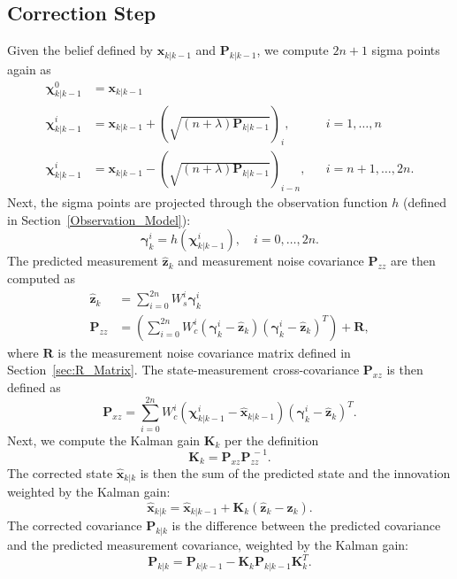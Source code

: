 \subsection{Correction Step}

Given the belief defined by $\mathbf{x}_{k | k-1}$ and $\mathbf{P}_{k | k-1}$, we compute $2n + 1$ sigma points again as
%
\begin{align}
\mathbf{\chi}^{0}_{k | k-1} &= \mathbf{x}_{k | k-1} & \nonumber\\
\mathbf{\chi}^{i}_{k | k-1} &= \mathbf{x}_{k | k-1} + \left( \sqrt{\left( n + \lambda \right) \mathbf{P}_{k | k-1}} \right)_{i}, &&i = 1, \dots, n \\
\mathbf{\chi}^{i}_{k | k-1} &= \mathbf{x}_{k | k-1} - \left( \sqrt{\left( n + \lambda \right) \mathbf{P}_{k | k-1}} \right)_{i-n}, &&i = n+1, \dots, 2n. \nonumber
\end{align}
%
Next, the sigma points are projected through the observation function $h$ (defined in Section~\ref{Observation_Model}):
%
\begin{equation}
\mathbf{\gamma}^{i}_{k} = h \left( \mathbf{\chi}^{i}_{k | k-1} \right), \quad i = 0, \dots, 2n.
\end{equation}
%
The predicted measurement $\hat{\mathbf{z}}_{k}$ and measurement noise covariance $\mathbf{P}_{zz}$ are then computed as
%
\begin{align}
\hat{\mathbf{z}}_{k} &= \sum^{2n}_{i=0} W^{i}_{s} \mathbf{\gamma}^{i}_{k} \\
\mathbf{P}_{zz} &= \left( \sum^{2n}_{i=0} W^{i}_{c} \left( \mathbf{\gamma}^{i}_{k} - \hat{\mathbf{z}}_{k} \right) \left( \mathbf{\gamma}^{i}_{k} - \hat{\mathbf{z}}_{k} \right)^{T} \right) + \mathbf{R},
\end{align}
%
where $\mathbf{R}$ is the measurement noise covariance matrix defined in Section~\ref{sec:R_Matrix}. The state-measurement cross-covariance $\mathbf{P}_{xz}$ is then defined as
%
\begin{equation}
\mathbf{P}_{xz} = \sum^{2n}_{i=0} W^{i}_{c} \left( \mathbf{\chi}^{i}_{k | k-1} - \hat{\mathbf{x}}_{k | k-1} \right) \left( \mathbf{\gamma}^{i}_{k} - \hat{\mathbf{z}}_{k} \right)^{T} .
\end{equation}
%
Next, we compute the Kalman gain $\mathbf{K}_{k}$ per the definition
%
\begin{equation}
\mathbf{K}_{k} = \mathbf{P}_{xz} \mathbf{P}^{\,-1}_{zz}.
\end{equation}
%
The corrected state $\hat{\mathbf{x}}_{k | k}$ is then the sum of the predicted state and the innovation weighted by the Kalman gain:
%
\begin{equation}
\hat{\mathbf{x}}_{k | k} = \hat{\mathbf{x}}_{k | k-1} + \mathbf{K}_{k} \left( \hat{\mathbf{z}}_{k} - \mathbf{z}_{k} \right) .
\end{equation}
%
The corrected covariance $\mathbf{P}_{k | k}$ is the difference between the predicted covariance and the predicted measurement covariance, weighted by the Kalman gain:
%
\begin{equation}
\mathbf{P}_{k | k} = \mathbf{P}_{k | k-1} - \mathbf{K}_{k} \mathbf{P}_{k | k-1} \mathbf{K}_{k}^{T} .
\end{equation}

